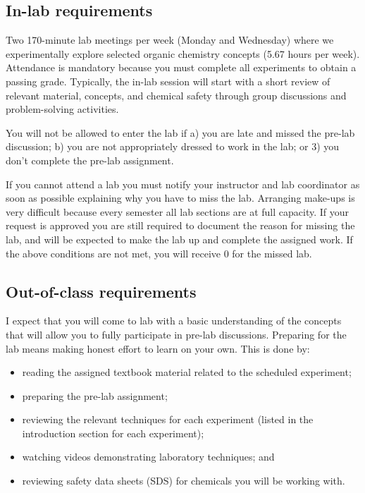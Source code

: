 \hypertarget{in-lab-requirements}{%
\subsection{In-lab requirements}\label{in-lab-requirements}}

Two 170-minute lab meetings per week (Monday and Wednesday) where we
experimentally explore selected organic chemistry concepts (5.67 hours
per week). Attendance is mandatory because you must complete all
experiments to obtain a passing grade. Typically, the in-lab session
will start with a short review of relevant material, concepts, and
chemical safety through group discussions and problem-solving
activities.

You will not be allowed to enter the lab if a) you are late and missed
the pre-lab discussion; b) you are not appropriately dressed to work in
the lab; or 3) you don't complete the pre-lab assignment.

If you cannot attend a lab you must notify your instructor and lab
coordinator as soon as possible explaining why you have to miss the lab.
Arranging make-ups is very difficult because every semester all lab
sections are at full capacity. If your request is approved you are still
required to document the reason for missing the lab, and will be
expected to make the lab up and complete the assigned work. If the above
conditions are not met, you will receive 0 for the missed lab.

\hypertarget{out-of-class-requirements}{%
\subsection{Out-of-class requirements}\label{out-of-class-requirements}}

I expect that you will come to lab with a basic understanding of the
concepts that will allow you to fully participate in pre-lab
discussions. Preparing for the lab means making honest effort to learn
on your own. This is done by:

\begin{itemize}
\tightlist
\item
  reading the assigned textbook material related to the scheduled
  experiment;
\item
  preparing the pre-lab assignment;
\item
  reviewing the relevant techniques for each experiment (listed in the
  introduction section for each experiment);
\item
  watching videos demonstrating laboratory techniques; and
\item
  reviewing safety data sheets (SDS) for chemicals you will be working
  with.
\end{itemize}

